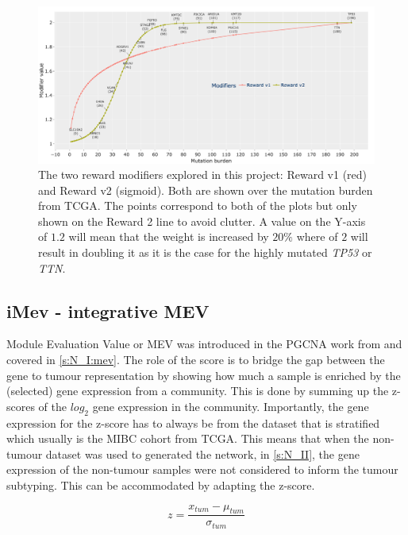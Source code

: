 \begin{figure}[H]    
    \centering
    \includegraphics[width=1.0\textwidth,height=1.0\textheight,keepaspectratio]{Sections/Network_II/validation/reward_modifiers.png}
    \caption{The two reward modifiers explored in this project: Reward v1 (red) and Reward v2 (sigmoid). Both are shown over the mutation burden from TCGA. The points correspond to both of the plots but only shown on the Reward 2 line to avoid clutter. A value on the Y-axis of $1.2$ will mean that the weight is increased by $20\%$ where of $2$ will result in doubling it as it is the case for the highly mutated \textit{TP53} or \textit{TTN}. }
    \label{fig:N_II:modifiers_comp}
\end{figure}


\subsection*{iMev - integrative MEV} \label{s:N_II:iMEV}

Module Evaluation Value or MEV was introduced in the PGCNA work from \citet{Care2019-ij} and covered in \cref{s:N_I:mev}. The role of the score is to bridge the gap between the gene to tumour representation by showing how much a sample is enriched by the (selected) gene expression from a community. This is done by summing up the z-scores of the $log_2$ gene expression in the community. Importantly, the gene expression  for the z-score has to always be from the dataset that is stratified which usually is the MIBC cohort from TCGA. This means that when the non-tumour dataset was used to generated the network, in \cref{s:N_II}, the gene expression of the non-tumour samples were not considered to inform the tumour subtyping. This can be accommodated by adapting the z-score.

\begin{equation} \label{eq:N_II:z_score}
z = \frac{x_{tum} - \mu_{tum}}{\sigma_{tum}}
\end{equation}

